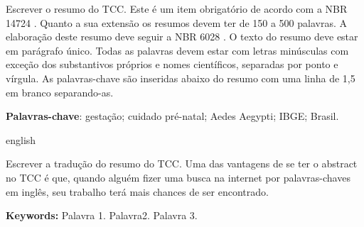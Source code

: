 \documentclass[
        oneside,      %
        english,			
        brazil			 
        ]{configcefetmglpd}
\begin{document}
\begin{resumo_cefetmg}
	
\aplicaresumo

Escrever o resumo do TCC. Este é um item obrigatório de acordo com a NBR 14724 \cite{bib:abnt14724}. 
Quanto a sua extensão os resumos devem ter de 150 a 500 palavras. 
A elaboração deste resumo deve seguir a NBR 6028 \cite{bib:abnt6028}. 
O texto do resumo deve estar em parágrafo único. Todas as palavras devem estar com letras minúsculas com exceção dos substantivos
próprios e nomes científicos, separadas por ponto e vírgula. 
As palavras-chave são inseridas abaixo do resumo com uma linha de 1,5 em branco separando-as.

\noindent
\textbf{Palavras-chave}: gestação; cuidado pré-natal; Aedes Aegypti; IBGE; Brasil.

\end{resumo_cefetmg}
 
 
\begin{abstract_cefetmg}
 \begin{otherlanguage*}{english}

\aplicaabstract

Escrever a tradução do resumo do TCC. Uma das vantagens de se ter o abstract no TCC é que, quando alguém fizer uma busca na
internet por palavras-chaves em inglês, seu trabalho terá mais chances de ser encontrado. 

\noindent
\textbf{Keywords:} Palavra 1. Palavra2. Palavra 3. %

  \end{otherlanguage*}
\end{abstract_cefetmg}


\printatermo



\figvariadas   %
\listfigvariadas  %
\end{document}
